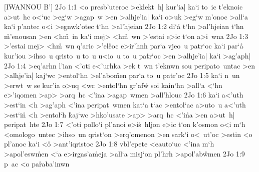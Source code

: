 [IWANNOU B']
\vs 2Jo 1:1
<o
presb'uteroc
>eklekt~h|
kur'ia|
ka`i
to~ic
t'eknoic
a>ut~hc
o<`uc
>eg`w
>agap~w
>en
>alhje'ia|
ka`i
o>uk
>eg`w
m'onoc
>all`a
ka`i
p'antec
o<i
>egnwk'otec
t`hn
>al'hjeian\bibvsend
\vs 2Jo 1:2
di`a\r{}
t`hn
>al'hjeian
t`hn
\r{m}'enousan
>en
<h\r{m}~in
ka`i
mej>
<h\r{m}~wn
>'estai
e>ic
t`on
a>i~wna\bibvsend
\vs 2Jo 1:3
>'estai
mej>
<h\r{m}~wn
q'aric
>'el\r{e}oc
e>ir'hnh
par`a
vjeo~u
patr`oc
ka`i
par`a\r{}
kur'iou
>ihso~u
qristo~u
to~u
u<io~u
to~u
pa\r{t}r`oc
>en
>alhje'ia|
ka`i
>ag'aph|\bibvsend
\vs 2Jo 1:4
>eq'arhn
l'ian
<'oti
e<'urhka
>ek
t~wn
t'eknwn
sou
peripato~untac
>en
>alhje'ia|
kaj`wc
>entol`hn
>el'abo\r{m}en
par`a
to~u
patr'oc\bibvsend
\vs 2Jo 1:5
ka`i
n~un
>erwt~w
se
kur'ia
o>uq
<wc
>entol`hn
gr'afw\r{}
soi
kain`hn
>all`a
<`hn
e>'iqomen
>ap>
>arq~hc
<'ina
>agap~wmen
>all'hlouc\bibvsend
\vs 2Jo 1:6
ka`i
a<'uth
>est`in
<h
>ag'aph
<'ina
peripat~wmen
kat`a
t`ac
>entol`ac
a>uto~u
a<'uth
>est`in\r{}
<h
>entol`h
\r{k}aj`wc
>hko'usate
>ap>
>arq~hc
<'i\r{n}a
>en
a>ut~h|
peripat~hte\bibvsend
\vs 2Jo 1:7
<'oti
pollo`i
pl'anoi
e>i\r{s}~hljon
e>ic
t`on
k'osmon
o<i
m`h
<omologo~untec
>ihso~un
qrist`on
>erq'omenon
>en
sark`i
o<~ut'oc
>estin
<o
pl'anoc
ka`i
<o\r{}
>ant'iqristoc\bibvsend
\vs 2Jo 1:8
vbl'epete
<eauto`uc
<'ina
m`h
>apol'esw\r{m}en
<`a
e>irgas'a\r{m}eja
>all`a
misj`on
pl'hrh
>apol'ab\r{w}men\bibvsend
{}
\vs 2Jo 1:9
p~ac
<o
pa\r{r}aba'inwn
